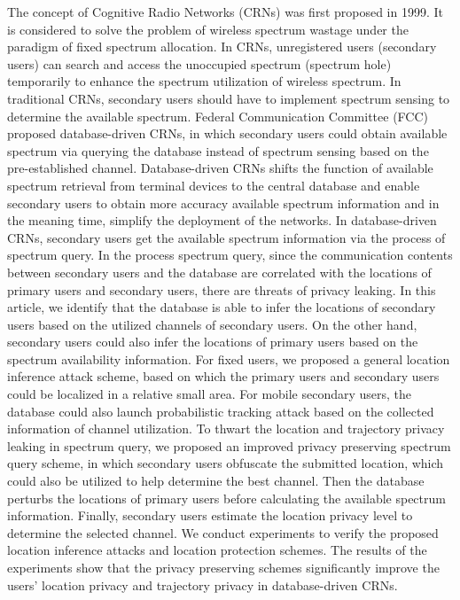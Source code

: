 \begin{englishabstract}

The concept of Cognitive Radio Networks (CRNs) was first proposed in 1999. It is considered to solve the problem of wireless spectrum wastage under the paradigm of fixed spectrum allocation. In CRNs, unregistered users (secondary users) can search and access the unoccupied spectrum (spectrum hole) temporarily to enhance the spectrum utilization of wireless spectrum. In traditional CRNs, secondary users should have to implement spectrum sensing to determine the available spectrum. Federal Communication Committee (FCC) proposed database-driven CRNs, in which secondary users could obtain available spectrum via querying the database instead of spectrum sensing based on the pre-established channel. Database-driven CRNs shifts the function of available spectrum retrieval from terminal devices to the central database and enable secondary users to obtain more accuracy available spectrum information and in the meaning time, simplify the deployment of the networks. 
In database-driven CRNs, secondary users get the available spectrum information via the process of spectrum query. In the process spectrum query, since the communication contents between secondary users and the database are correlated with the locations of primary users and secondary users, there are threats of privacy leaking. In this article, we identify that the database is able to infer the locations of secondary users based on the utilized channels of secondary users. On the other hand, secondary users could also infer the locations of primary users based on the spectrum availability information. For fixed users, we proposed a general location inference attack scheme, based on which the primary users and secondary users could be localized in a relative small area. For mobile secondary users, the database could also launch probabilistic tracking attack based on the collected information of channel utilization. To thwart the location and trajectory privacy leaking in spectrum query, we proposed an improved privacy preserving spectrum query scheme, in which secondary users obfuscate the submitted location, which could also be utilized to help determine the best channel. Then the database perturbs the locations of primary users before calculating the available spectrum information. Finally, secondary users estimate the location privacy level to determine the selected channel. We conduct experiments to verify the proposed location inference attacks and location protection schemes. The results of the experiments show that the privacy preserving schemes significantly improve the users’ location privacy and trajectory privacy in database-driven CRNs.

\end{englishabstract}
